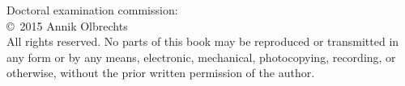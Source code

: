 

\newpage
\thispagestyle{empty}




\begin{large}

\begin{center}
\begin{minipage}{15cm}
Doctoral examination commission:\\[2mm]


\copyright \, 2015 Annik Olbrechts\\[0.5cm]
All rights reserved. No parts of this book may be reproduced or transmitted in any form or by
any means, electronic, mechanical, photocopying, recording, or otherwise, without the prior
written permission of the author.


\end{minipage}
\end{center}
\end{large}
